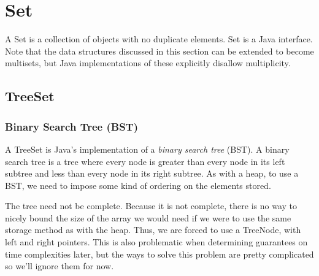 \documentclass[11pt]{book}
\begin{document}
\section{Set}

A Set is a collection of objects with no duplicate elements. Set is a Java interface. Note that the data structures discussed in this section can be extended to become multisets, but Java implementations of these explicitly disallow multiplicity.

\subsection{TreeSet}

\subsubsection{Binary Search Tree (BST)}

A TreeSet is Java's implementation of a \textit{binary search tree} (BST). A binary search tree is a tree where every node is greater than every node in its left subtree and less than every node in its right subtree. As with a heap, to use a BST, we need to impose some kind of ordering on the elements stored.

\begin{center}
\end{center}

The tree need not be complete. Because it is not complete, there is no way to nicely bound the size of the array we would need if we were to use the same storage method as with the heap. Thus, we are forced to use a TreeNode, with left and right pointers. This is also problematic when determining guarantees on time complexities later, but the ways to solve this problem are pretty complicated so we'll ignore them for now.
\end{document}
